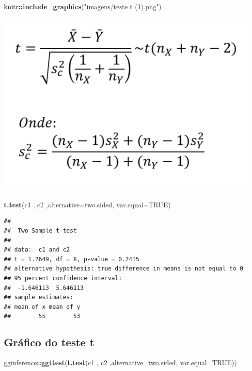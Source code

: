\documentclass[
]{book}
\newenvironment{Shaded}{\begin{snugshade}}{\end{snugshade}}
\newcommand{\AttributeTok}[1]{\textcolor[rgb]{0.13,0.29,0.53}{#1}}
\newcommand{\ConstantTok}[1]{\textcolor[rgb]{0.56,0.35,0.01}{#1}}
\newcommand{\FunctionTok}[1]{\textcolor[rgb]{0.13,0.29,0.53}{\textbf{#1}}}
\newcommand{\NormalTok}[1]{#1}
\newcommand{\SpecialCharTok}[1]{\textcolor[rgb]{0.81,0.36,0.00}{\textbf{#1}}}
\newcommand{\StringTok}[1]{\textcolor[rgb]{0.31,0.60,0.02}{#1}}
\begin{document}
\begin{Shaded}
\begin{Highlighting}[]
\NormalTok{knitr}\SpecialCharTok{::}\FunctionTok{include\_graphics}\NormalTok{(}\StringTok{"imagens/teste t (1).png"}\NormalTok{)}
\end{Highlighting}
\end{Shaded}

\includegraphics{imagens/teste t (1).png}

\begin{Shaded}
\begin{Highlighting}[]
\FunctionTok{t.test}\NormalTok{(c1 , c2 ,}\AttributeTok{alternative=}\StringTok{\textquotesingle{}two.sided\textquotesingle{}}\NormalTok{, }\AttributeTok{var.equal=}\ConstantTok{TRUE}\NormalTok{)}
\end{Highlighting}
\end{Shaded}

\begin{verbatim}
## 
##  Two Sample t-test
## 
## data:  c1 and c2
## t = 1.2649, df = 8, p-value = 0.2415
## alternative hypothesis: true difference in means is not equal to 0
## 95 percent confidence interval:
##  -1.646113  5.646113
## sample estimates:
## mean of x mean of y 
##        55        53
\end{verbatim}

\subsection{Gráfico do teste t}\label{gruxe1fico-do-teste-t}

\begin{Shaded}
\begin{Highlighting}[]
\NormalTok{gginference}\SpecialCharTok{::}\FunctionTok{ggttest}\NormalTok{(}\FunctionTok{t.test}\NormalTok{(c1 , c2 ,}\AttributeTok{alternative=}\StringTok{\textquotesingle{}two.sided\textquotesingle{}}\NormalTok{, }\AttributeTok{var.equal=}\ConstantTok{TRUE}\NormalTok{))}
\end{Highlighting}
\end{Shaded}
\end{document}
